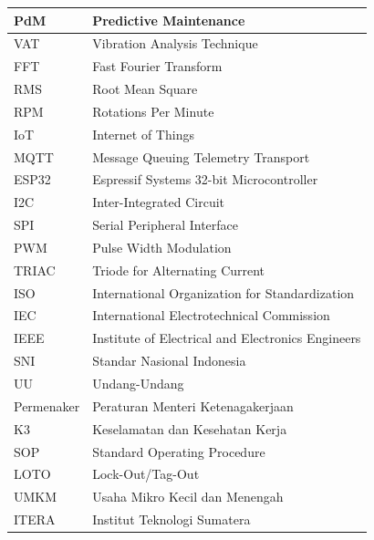 \documentclass{elsinta}
\begin{document}
\begin{longtable}{|p{4cm}|p{11cm}|}
    PdM & Predictive Maintenance \\
    \hline
    VAT & Vibration Analysis Technique \\
    \hline
    FFT & Fast Fourier Transform \\
    \hline
    RMS & Root Mean Square \\
    \hline
    RPM & Rotations Per Minute \\
    \hline
    IoT & Internet of Things \\
    \hline
    MQTT & Message Queuing Telemetry Transport \\
    \hline
    ESP32 & Espressif Systems 32-bit Microcontroller \\
    \hline
    I2C & Inter-Integrated Circuit \\
    \hline
    SPI & Serial Peripheral Interface \\
    \hline
    PWM & Pulse Width Modulation \\
    \hline
    TRIAC & Triode for Alternating Current \\
    \hline
    ISO & International Organization for Standardization \\
    \hline
    IEC & International Electrotechnical Commission \\
    \hline
    IEEE & Institute of Electrical and Electronics Engineers \\
    \hline
    SNI & Standar Nasional Indonesia \\
    \hline
    UU & Undang-Undang \\
    \hline
    Permenaker & Peraturan Menteri Ketenagakerjaan \\
    \hline
    K3 & Keselamatan dan Kesehatan Kerja \\
    \hline
    SOP & Standard Operating Procedure \\
    \hline
    LOTO & Lock-Out/Tag-Out \\
    \hline
    UMKM & Usaha Mikro Kecil dan Menengah \\
    \hline
    ITERA & Institut Teknologi Sumatera \\
    \hline
\end{longtable}
\end{document}
